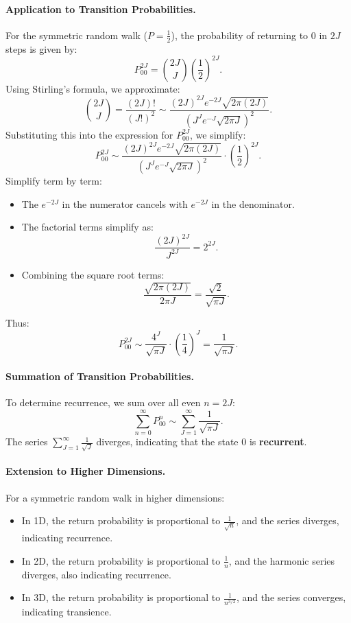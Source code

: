\paragraph{Application to Transition Probabilities.}  
For the symmetric random walk (\( P = \frac{1}{2} \)), the probability of returning to \( 0 \) in \( 2J \) steps is given by:
\[
P_{00}^{2J} = \binom{2J}{J} \left(\frac{1}{2}\right)^{2J}.
\]
Using Stirling's formula, we approximate:
\[
\binom{2J}{J} = \frac{(2J)!}{(J!)^2} \sim \frac{(2J)^{2J} e^{-2J} \sqrt{2 \pi (2J)}}{\left(J^J e^{-J} \sqrt{2 \pi J}\right)^2}.
\]
Substituting this into the expression for \( P_{00}^{2J} \), we simplify:
\[
P_{00}^{2J} \sim \frac{(2J)^{2J} e^{-2J} \sqrt{2 \pi (2J)}}{\left(J^J e^{-J} \sqrt{2 \pi J}\right)^2} \cdot \left(\frac{1}{2}\right)^{2J}.
\]
Simplify term by term:
\begin{itemize}
    \item The \( e^{-2J} \) in the numerator cancels with \( e^{-2J} \) in the denominator.
    \item The factorial terms simplify as:
\[
\frac{(2J)^{2J}}{J^{2J}} = 2^{2J}.
\]
    \item Combining the square root terms:
\[
\frac{\sqrt{2 \pi (2J)}}{2 \pi J} = \frac{\sqrt{2}}{\sqrt{\pi J}}.
\]
\end{itemize}
Thus:
\[
P_{00}^{2J} \sim \frac{4^J}{\sqrt{\pi J}} \cdot \left(\frac{1}{4}\right)^J = \frac{1}{\sqrt{\pi J}}.
\]

\paragraph{Summation of Transition Probabilities.}  
To determine recurrence, we sum over all even \( n = 2J \):
\[
\sum_{n=0}^\infty P_{00}^n \sim \sum_{J=1}^\infty \frac{1}{\sqrt{\pi J}}.
\]
The series \( \sum_{J=1}^\infty \frac{1}{\sqrt{J}} \) diverges, indicating that the state \( 0 \) is \textbf{recurrent}.

\paragraph{Extension to Higher Dimensions.}  
For a symmetric random walk in higher dimensions:  
\begin{itemize}
    \item In 1D, the return probability is proportional to \( \frac{1}{\sqrt{n}} \), and the series diverges, indicating recurrence.
    \item In 2D, the return probability is proportional to \( \frac{1}{n} \), and the harmonic series diverges, also indicating recurrence.
    \item In 3D, the return probability is proportional to \( \frac{1}{n^{3/2}} \), and the series converges, indicating transience.
\end{itemize}






